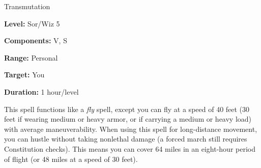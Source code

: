 
Transmutation

\textbf{Level:} Sor/Wiz 5

\textbf{Components:} V, S

\textbf{Range:} Personal

\textbf{Target:} You

\textbf{Duration:} 1 hour/level

This spell functions like a \textit{fly} spell, except you can fly at a speed of 
40 feet (30 feet if wearing medium or heavy armor, or if carrying a medium or heavy 
load) with average maneuverability. When using this spell for long-distance movement, 
you can hustle without taking nonlethal damage (a forced march still requires Constitution 
checks). This means you can cover 64 miles in an eight-hour period of flight (or 
48 miles at a speed of 30 feet).

